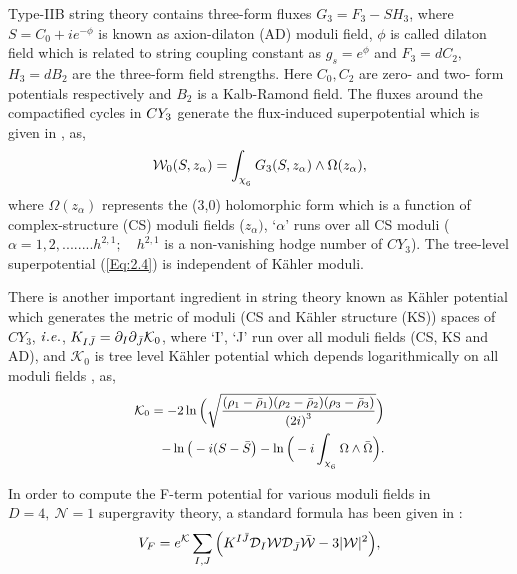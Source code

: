 \documentclass[doublecol]{epl2}
\begin{document}
  Type-IIB string theory contains three-form fluxes $ G_3 = F_3 - S H_3$, where $S=C_0 + ie^{-\phi}$ is known as axion-dilaton (AD) moduli field, $\phi$ is called dilaton field which is related to string coupling constant as $g_s = e^\phi$ and $F_3 =dC_2, $\quad$ $$ H_3 =dB_2$ are the three-form field strengths. Here $C_0, C_2$ are zero- and two-  form potentials respectively and $B_2$ is a Kalb-Ramond field. The fluxes around the compactified cycles in $\boldmath CY_3$ generate the flux-induced superpotential which is given in \cite{Gukov:1999ya}, as,
 \begin{equation}\small
    \mathcal{W}_0 (S,z_\alpha)  = \int_{\chi_{_6}} G_3 (S,z_\alpha) \wedge \Omega {(z_\alpha) }, 
    \label{Eq:2.4}
 \end{equation}
  where  $\Omega {(z_\alpha)}$ represents the (3,0) holomorphic form which is a function of complex-structure (CS) moduli fields ($z_\alpha)$, `$\alpha$' runs over all CS moduli ($\alpha = 1,2,........h^{2,1}; \quad   h^{2,1}$ is a non-vanishing hodge number of $CY_3$). The tree-level superpotential (\ref{Eq:2.4}) is independent of K\"ahler moduli. \par 
 There is another important ingredient in string theory known as K\"ahler potential which generates the metric of moduli (CS and K\"ahler structure (KS)) spaces of $ CY_3$,  $\it{i.e.}$, $K_{I\Bar{J}} =\partial_I \partial_{\Bar{J}}\mathcal{K}_0$, where `I', `J' run over all moduli fields (CS, KS and AD), and $\mathcal{K}_0$ is tree level K\"ahler potential which depends logarithmically on all moduli fields \cite{Basiouris:2021sdf,Let:2022fmu}, as,
 \begin{equation}\small
 \begin{split}
     \mathcal{K}_0 =-2 \ln \Big(\sqrt{\frac{(\rho_1 -\Bar{\rho}_1)(\rho_2-\Bar{\rho}_2)(\rho_3-\Bar{\rho}_3)}{ \left(2i\right)^3}}\Big)\\ - \ln \big(-i(S-\Bar{S}\big) - \ln \Big(-i\int_{\chi_{_6}}\Omega\wedge\Bar{\Omega}\Big). 
     \label{eq:2.6}
     \end{split}
 \end{equation}\par
 In order to compute the F-term potential for various moduli fields in $D=4,\  \mathcal{N}=1$ supergravity theory, a standard formula has been given in \cite{Giddings:2001yu}:
 \begin{align}\small
     V_F =e^{\mathcal{K}} \sum_{I,J} \Big(K^{I\Bar{J}}\mathcal{D}_I \mathcal{W}\mathcal{D}_{\Bar{J}}\mathcal{\Bar{W}}-3| \mathcal{W}|^2 \Big),
     \label{Eq:2.7}

\end{align}$$
\end{document}

